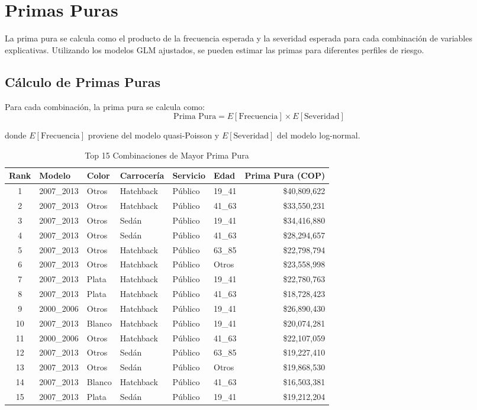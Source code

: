 \section{Primas Puras}

La prima pura se calcula como el producto de la frecuencia esperada y la severidad esperada para cada combinación de variables explicativas. Utilizando los modelos GLM ajustados, se pueden estimar las primas para diferentes perfiles de riesgo.

\subsection{Cálculo de Primas Puras}

Para cada combinación, la prima pura se calcula como:
\begin{equation}
\text{Prima Pura} = E[\text{Frecuencia}] \times E[\text{Severidad}]
\end{equation}

donde $E[\text{Frecuencia}]$ proviene del modelo quasi-Poisson y $E[\text{Severidad}]$ del modelo log-normal.

\begin{table}[H]
\centering
\caption{Top 15 Combinaciones de Mayor Prima Pura}
\begin{tabular}{|c|l|l|l|l|l|r|}
\hline
\textbf{Rank} & \textbf{Modelo} & \textbf{Color} & \textbf{Carrocería} & \textbf{Servicio} & \textbf{Edad} & \textbf{Prima Pura (COP)} \\
\hline
1 & 2007\_2013 & Otros & Hatchback & Público & 19\_41 & \$40,809,622 \\
2 & 2007\_2013 & Otros & Hatchback & Público & 41\_63 & \$33,550,231 \\
3 & 2007\_2013 & Otros & Sedán & Público & 19\_41 & \$34,416,880 \\
4 & 2007\_2013 & Otros & Sedán & Público & 41\_63 & \$28,294,657 \\
5 & 2007\_2013 & Otros & Hatchback & Público & 63\_85 & \$22,798,794 \\
6 & 2007\_2013 & Otros & Hatchback & Público & Otros & \$23,558,998 \\
7 & 2007\_2013 & Plata & Hatchback & Público & 19\_41 & \$22,780,763 \\
8 & 2007\_2013 & Plata & Hatchback & Público & 41\_63 & \$18,728,423 \\
9 & 2000\_2006 & Otros & Hatchback & Público & 19\_41 & \$26,890,430 \\
10 & 2007\_2013 & Blanco & Hatchback & Público & 19\_41 & \$20,074,281 \\
11 & 2000\_2006 & Otros & Hatchback & Público & 41\_63 & \$22,107,059 \\
12 & 2007\_2013 & Otros & Sedán & Público & 63\_85 & \$19,227,410 \\
13 & 2007\_2013 & Otros & Sedán & Público & Otros & \$19,868,530 \\
14 & 2007\_2013 & Blanco & Hatchback & Público & 41\_63 & \$16,503,381 \\
15 & 2007\_2013 & Plata & Sedán & Público & 19\_41 & \$19,212,204 \\
\hline
\end{tabular}
\end{table}

